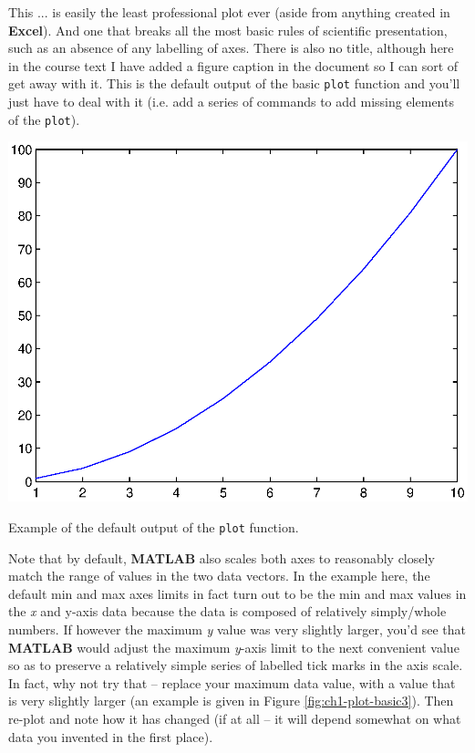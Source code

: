 \documentclass{tufte-book} %
\begin{document}
This ... is easily the least professional plot ever (aside from anything created in \textbf{Excel}). And one that breaks all the most basic rules of scientific presentation, such as an absence of any labelling of axes. There is also no title, although here in the course text I have added a figure caption in the document so I can sort of get away with it. This is the default output of the basic \texttt{plot} function and you'll just have to deal with it (i.e. add a series of commands to add missing elements of the \texttt{plot}).

\begin{marginfigure}[0.0in]
\includegraphics[width=\linewidth]{ch1-plot-basic1.eps}
\caption{Example of the default output of the \texttt{plot} function.}
\label{fig:plot-basic}
\end{marginfigure}

Note that by default, \textbf{MATLAB} also scales both axes to reasonably closely match the range of values in the two data vectors. In the example here, the default min and max
axes limits in fact turn out to be the min and max values in the \textit{x} and y-axis data because the data is composed of relatively simply/whole numbers. If however the maximum \textit{y} value was very  slightly larger, you'd see that \textbf{MATLAB} would adjust the maximum \textit{y}-axis limit to the next convenient value so as to preserve a relatively simple series of labelled tick marks in the axis scale. In fact, why not try that -- replace your maximum data value, with a value that is very slightly larger (an example is given in Figure \ref{fig:ch1-plot-basic3}).
 Then re-plot and note how it has changed (if at all -- it will depend somewhat on what data you invented in the first place).
\end{document}
